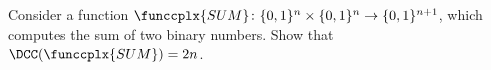 Consider a function $\funccplx{SUM}\colon \{0, 1\}^n \times \{0, 1\}^n \to \{0, 1\}^{n + 1}$, which
computes the sum of two binary numbers. Show that $\DCC(\funccplx{SUM}) = 2n$.
